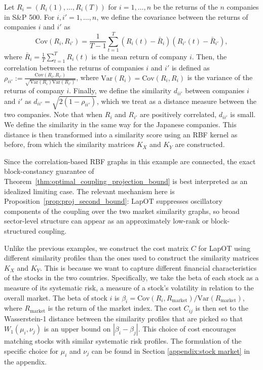 \documentclass{article}
\theoremstyle{definition}
\begin{document}
Let $R_i = (R_i(1), \ldots, R_i(T))$ for $i = 1, \ldots, n$ be the returns of the $n$ companies in S\&P 500. For $i, i' = 1, \ldots, n$, we define the covariance between the returns of companies $i$ and $i'$ as
\begin{equation*}
    \mathrm{Cov}(R_i, R_{i'}) = \frac{1}{T - 1} \sum_{t = 1}^{T} (R_i(t) - \bar{R}_i)(R_{i'}(t) - \bar{R}_{i'}),
\end{equation*}
where $\bar{R}_i = \frac{1}{T} \sum_{t = 1}^{T} R_i(t)$ is the mean return of company $i$. Then, the correlation between the returns of companies $i$ and $i'$ is defined as $\rho_{i i'} := \frac{\mathrm{Cov}(R_i, R_{i'})}{\sqrt{\mathrm{Var}(R_i) \mathrm{Var}(R_{i'})}}$, where $\mathrm{Var}(R_i) = \mathrm{Cov}(R_i, R_i)$ is the variance of the returns of company $i$. Finally, we define the similarity $d_{i i'}$ between companies $i$ and $i'$ as $d_{i i'} = \sqrt{2(1 - \rho_{i i'})}$, which we treat as a distance measure between the two companies. Note that when $R_i$ and $R_{i'}$ are positively correlated, $d_{i i'}$ is small. We define the similarity in the same way for the Japanese companies. This distance is then transformed into a similarity score using an RBF kernel as before, from which the similarity matrices $K_X$ and $K_Y$ are constructed. 

Since the correlation-based RBF graphs in this example are connected, the exact block-constancy guarantee of Theorem~\ref{thm:optimal_coupling_projection_bound} is best interpreted as an idealized limiting case. The relevant mechanism here is Proposition~\ref{prop:proj_second_bound}: LapOT suppresses oscillatory components of the coupling over the two market similarity graphs, so broad sector-level structure can appear as an approximately low-rank or block-structured coupling.

Unlike the previous examples, we construct the cost matrix $C$ for LapOT using different similarity profiles than the ones used to construct the similarity matrices $K_X$ and $K_Y$. This is because we want to capture different financial characteristics of the stocks in the two countries. Specifically, we take the beta of each stock as a measure of its systematic risk, a measure of a stock's volatility in relation to the overall market. The beta of stock $i$ is $\beta_i = \mathrm{Cov}(R_i, R_{\text{market}}) / \mathrm{Var}(R_{\text{market}})$, where $R_{\text{market}}$ is the return of the market index. The cost $C_{i j}$ is then set to the Wasserstein-1 distance between the similarity profiles that are picked so that $W_1(\mu_i,\nu_j)$ is an upper bound on $|\beta_i - \beta_j|$. This choice of cost encourages matching stocks with similar systematic risk profiles. The formulation of the specific choice for $\mu_i$ and $\nu_j$ can be found in Section \ref{appendix:stock market} in the appendix.
\end{document}
